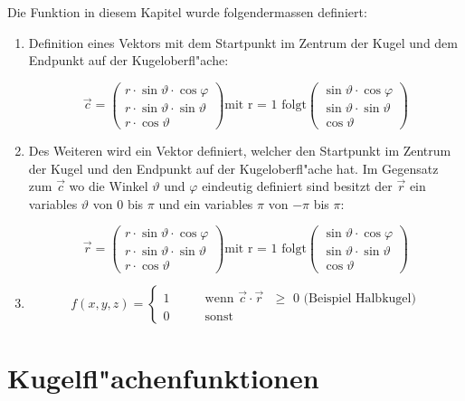 \begin{refsection}
Die Funktion in diesem Kapitel wurde folgendermassen definiert:
\begin{enumerate}

\item Definition eines Vektors mit dem Startpunkt im Zentrum der Kugel und dem Endpunkt auf der Kugeloberfl"ache:

$$
\vec{c} = 
\begin{pmatrix}
{r \cdot \sin\vartheta \cdot \cos\varphi}\\
{r \cdot \sin\vartheta \cdot \sin\vartheta}\\
{r \cdot \cos\vartheta}
\end{pmatrix}
\text{mit r = 1 folgt}
\begin{pmatrix}
{\sin\vartheta \cdot \cos\varphi}\\
{\sin\vartheta \cdot \sin\vartheta}\\
{\cos\vartheta}
\end{pmatrix}
$$

\item	Des Weiteren wird ein Vektor definiert, welcher den Startpunkt im Zentrum der Kugel und den Endpunkt auf der Kugeloberfl"ache hat. Im Gegensatz zum $\vec{c}$ wo die Winkel $\vartheta$ und $\varphi$ eindeutig definiert sind besitzt der $\vec{r}$ ein variables $\vartheta$ von 0 bis $\pi$ und ein variables $\pi$ von $-\pi$ bis $\pi$: 

$$
\vec{r} = 
\begin{pmatrix}
{r \cdot \sin\vartheta \cdot \cos\varphi}\\
{r \cdot \sin\vartheta \cdot \sin\vartheta}\\
{r \cdot \cos\vartheta}
\end{pmatrix}
\text{mit r = 1 folgt}
\begin{pmatrix}
{\sin\vartheta \cdot \cos\varphi}\\
{\sin\vartheta \cdot \sin\vartheta}\\
{\cos\vartheta}
\end{pmatrix}
$$

\item
\[
f(x,y,z) =\begin{cases}
1& \qquad \text{wenn $\vec c\cdot\vec r$ $\ge$ 0 (Beispiel Halbkugel)}\\
0& \qquad \text{sonst}
\end{cases}
\]
\end{enumerate}

\section{Kugelfl"achenfunktionen}


\end{refsection}
